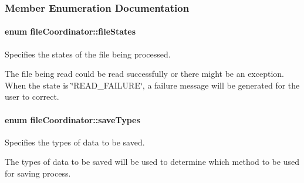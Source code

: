 \subsubsection{Member Enumeration Documentation}
\hypertarget{classfile_coordinator_ab3cb53f40d14c0d8f5c5c822331ffd72}{
\paragraph[{file\+States}]{\setlength{\rightskip}{0pt plus 5cm}enum {\bf file\+Coordinator\+::file\+States}}}\label{classfile_coordinator_ab3cb53f40d14c0d8f5c5c822331ffd72}


Specifies the states of the file being processed. 

The file being read could be read successfully or there might be an exception. When the state is \char`\"{}\+R\+E\+A\+D\+\_\+\+F\+A\+I\+L\+U\+R\+E\char`\"{}, a failure message will be generated for the user to correct. \hypertarget{classfile_coordinator_abe0581895323a5bbab5713fe662700f7}{
\paragraph[{save\+Types}]{\setlength{\rightskip}{0pt plus 5cm}enum {\bf file\+Coordinator\+::save\+Types}}}\label{classfile_coordinator_abe0581895323a5bbab5713fe662700f7}


Specifies the types of data to be saved. 

The types of data to be saved will be used to determine which method to be used for saving process. 

